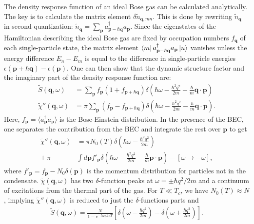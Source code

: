 \documentclass[reprint,
nofootinbib,
amsmath,amssymb,
aps]{revtex4-1}
\newcommand{\f}[2]{\frac{#1}{#2}}
\newcommand{\lp}{\left(}
\newcommand{\rp}{\right)}
\newcommand{\lb}{\left[}
\newcommand{\rb}{\right]}
\begin{document}
The density response function of an ideal Bose gas can be calculated analytically. The key is to calculate the matrix element $\delta \widetilde{n}_{\mathbf{q},mn}$. This is done by rewriting $\widetilde{n}_\mathbf{q}$ in second-quantization: $\widetilde{n}_\mathbf{q} = \sum_\mathbf{p} a^\dagger_{\mathbf{p} - \hbar \mathbf{q}} a_\mathbf{p} $. Since the eigenstates of the Hamiltonian describing the ideal Bose gas are fixed by occupation numbers $f_\mathbf{q}$ of each single-particle state, the matrix element $\bra{m} a^\dagger_{\mathbf{p} - \hbar \mathbf{q}} a_\mathbf{p} \ket{n}$ vanishes unless the energy difference $E_n - E_m$ is equal to the difference in single-particle energies $\epsilon(\mathbf{p} + \hbar \mathbf{q}) - \epsilon(\mathbf{p})$. One can then show that the dynamic structure factor and the imaginary part of the density response function are:
\begin{align*}
\widetilde{S}(\mathbf{q},\omega) &= \sum_\mathbf{p} f_\mathbf{p}(1 + f_{\mathbf{p} + \hbar \mathbf{q}}) \delta 
\lp
\hbar \omega - \f{\hbar^2 q^2}{ 2m} - \f{\hbar }{m} \mathbf{q}\cdot \mathbf{p}
\rp \\
\widetilde{\chi}''(\mathbf{q},\omega) 
&= 
\pi \sum_\mathbf{p} (f_\mathbf{p} - f_{\mathbf{p} + \hbar \mathbf{q}}) \delta 
\lp  
\hbar \omega - \f{\hbar^2 q^2}{ 2m} - \f{\hbar }{m} \mathbf{q}\cdot \mathbf{p}
\rp.
\end{align*}
Here, $f_\mathbf{p} = \langle a^\dagger_\mathbf{p} a_\mathbf{p}\rangle$ is the Bose-Einstein distribution. In the presence of the BEC, one separates the contribution from the BEC and integrate the rest over $\mathbf{p}$ to get
\begin{align*}
\widetilde{\chi}''(\mathbf{q},\omega) &= \pi  N_0(T) \delta \lp \hbar \omega - \f{\hbar^2 q^2}{2m} \rp  \\
 + \, \pi &\int d\mathbf{p} f'_\mathbf{p} \delta \lp \hbar \omega - \f{\hbar^2 q^2}{2m} - \f{\hbar}{m} \mathbf{p}\cdot \mathbf{p} \rp - [\omega \to -\omega], 
\end{align*}
where $f'_\mathbf{p} = f_\mathbf{p} - N_0 \delta(\mathbf{p})$ is the momentum distribution for particles not in the condensate. $\widetilde{\chi}(\mathbf{q},\omega)$ has two $\delta$-function peaks at $\omega = \pm \hbar q^2/2m$ and a continuum of excitations from the thermal part of the gas. For $T \ll T_c$, we have $N_0(T) \approx N$, implying $\widetilde{\chi}''(\mathbf{q},\omega)$ is reduced to just the $\delta$-functions parts and  
\begin{align*}
\widetilde{S}(\mathbf{q},\omega) = \f{N}{1 - e^{-\hbar \omega / k_BT}} \lb \delta\lp \omega - \f{\hbar q^2}{2m} \rp - \delta \lp  \omega + \f{\hbar q^2}{2m} \rp \rb.
\end{align*}
\end{document}
